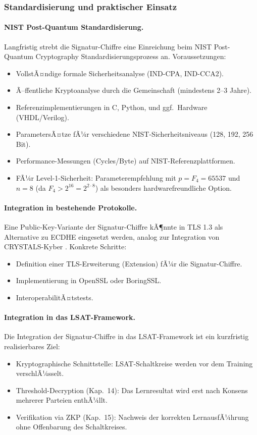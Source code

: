 ﻿\documentclass[a4paper,12pt]{scrreprt}
\theoremstyle{definition}
\begin{document}
\subsubsection{Standardisierung und praktischer Einsatz}

\paragraph{NIST Post-Quantum Standardisierung.}
Langfristig strebt die Signatur-Chiffre eine Einreichung beim NIST Post-Quantum Cryptography Standardisierungsprozess \cite{NIST22} an. Voraussetzungen:
\begin{itemize}
    \item VollstÃ¤ndige formale Sicherheitsanalyse (IND-CPA, IND-CCA2).
    \item Ã–ffentliche Kryptoanalyse durch die Gemeinschaft (mindestens 2--3 Jahre).
    \item Referenzimplementierungen in C, Python, und ggf.\ Hardware (VHDL/Verilog).
    \item ParametersÃ¤tze fÃ¼r verschiedene NIST-Sicherheitsniveaus (128, 192, 256 Bit).
    \item Performance-Messungen (Cycles/Byte) auf NIST-Referenzplattformen.
    \item FÃ¼r Level-1-Sicherheit: Parameterempfehlung mit $p = F_4 = 65537$ und $n = 8$ (da $F_4 > 2^{16} = 2^{2\cdot8}$) als besonders hardwarefreundliche Option.
\end{itemize}

\paragraph{Integration in bestehende Protokolle.}
Eine Public-Key-Variante der Signatur-Chiffre kÃ¶nnte in TLS 1.3 \cite{Res18} als Alternative zu ECDHE eingesetzt werden, analog zur Integration von CRYSTALS-Kyber \cite{ABD+22}. Konkrete Schritte:
\begin{itemize}
    \item Definition einer TLS-Erweiterung (Extension) fÃ¼r die Signatur-Chiffre.
    \item Implementierung in OpenSSL oder BoringSSL.
    \item InteroperabilitÃ¤tstests.
\end{itemize}

\paragraph{Integration in das LSAT-Framework.}
Die Integration der Signatur-Chiffre in das LSAT-Framework \cite{Epp26d} ist ein kurzfristig realisierbares Ziel:
\begin{itemize}
    \item Kryptographische Schnittstelle: LSAT-Schaltkreise werden vor dem Training verschlÃ¼sselt.
    \item Threshold-Decryption (Kap.~14): Das Lernresultat wird erst nach Konsens mehrerer Parteien enthÃ¼llt.
    \item Verifikation via ZKP (Kap.~15): Nachweis der korrekten LernausfÃ¼hrung ohne Offenbarung des Schaltkreises.
\end{itemize}
\end{document}
